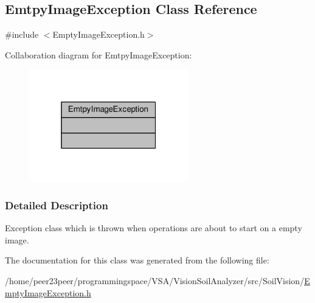 \hypertarget{class_emtpy_image_exception}{}\subsection{Emtpy\+Image\+Exception Class Reference}
\label{class_emtpy_image_exception}


{\ttfamily \#include $<$Empty\+Image\+Exception.\+h$>$}



Collaboration diagram for Emtpy\+Image\+Exception\+:
\nopagebreak
\begin{figure}[H]
\begin{center}
\leavevmode
\includegraphics[width=196pt]{class_emtpy_image_exception__coll__graph}
\end{center}
\end{figure}


\subsubsection{Detailed Description}
Exception class which is thrown when operations are about to start on a empty image. 

The documentation for this class was generated from the following file\+:\begin{DoxyCompactItemize}
\item 
/home/peer23peer/programmingspace/\+V\+S\+A/\+Vision\+Soil\+Analyzer/src/\+Soil\+Vision/\hyperlink{_empty_image_exception_8h}{Empty\+Image\+Exception.\+h}\end{DoxyCompactItemize}
